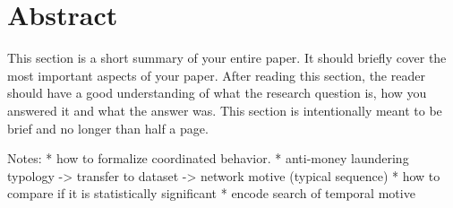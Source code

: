 \documentclass{thesisclass}
\begin{document}
\frontmatter
{}



{}
\clearpage
\tableofcontents


{
\clearpage
{} %
\listoffigures {} 
\clearpage
{} %
\listoftables  {} 
\printnomenclature   {} 
}
{
\clearpage
{} %
\listoffigures {} 
\clearpage
{} %
\listoftables {} 
\printnomenclature {}
}








\mainmatter
{}


\chapter*{Abstract} 
This section is a short summary of your entire paper. It should briefly cover the most important aspects of your paper. After reading this section, the reader should have a good understanding of what the research question is, how you answered it and what the answer was. This section is intentionally meant to be brief and no longer than half a page.


Notes:
* how to formalize coordinated behavior.
* anti-money laundering typology -> transfer to dataset -> network motive (typical sequence)
* how to compare if it is statistically significant 
* encode search of temporal motive 
\end{document}
